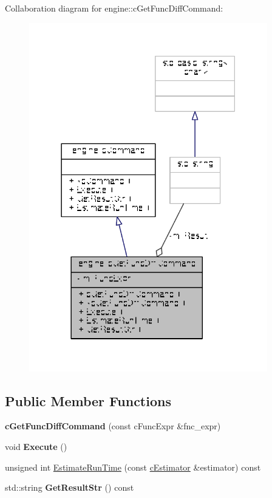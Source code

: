 Collaboration diagram for engine\-:\-:c\-Get\-Func\-Diff\-Command\-:
\nopagebreak
\begin{figure}[H]
\begin{center}
\leavevmode
\includegraphics[width=294pt]{classengine_1_1cGetFuncDiffCommand__coll__graph}
\end{center}
\end{figure}
\subsection*{Public Member Functions}
\begin{DoxyCompactItemize}
\item 
\hypertarget{classengine_1_1cGetFuncDiffCommand_ac98f7772924b397337974556f4e08d1b}{{\bfseries c\-Get\-Func\-Diff\-Command} (const c\-Func\-Expr \&fnc\-\_\-expr)}\label{classengine_1_1cGetFuncDiffCommand_ac98f7772924b397337974556f4e08d1b}

\item 
\hypertarget{classengine_1_1cGetFuncDiffCommand_a69721a33bcc6e92accc1644cb618584c}{void {\bfseries Execute} ()}\label{classengine_1_1cGetFuncDiffCommand_a69721a33bcc6e92accc1644cb618584c}

\item 
unsigned int \hyperlink{classengine_1_1cGetFuncDiffCommand_a04ff9402f8dfeea9d3039d40db0fb3eb}{Estimate\-Run\-Time} (const \hyperlink{classengine_1_1cEstimator}{c\-Estimator} \&estimator) const 
\item 
\hypertarget{classengine_1_1cGetFuncDiffCommand_ad67b996b04155b47d1b7ba067b04bc5d}{std\-::string {\bfseries Get\-Result\-Str} () const }\label{classengine_1_1cGetFuncDiffCommand_ad67b996b04155b47d1b7ba067b04bc5d}

\end{DoxyCompactItemize}
